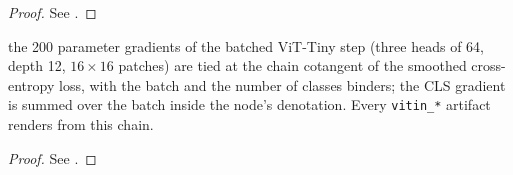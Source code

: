 \begin{proof}
\leanok
See .
\end{proof}

\begin{theorem}
  \label{thm:vit_step_tie}
  \leanok
  \Prove{} the 200 parameter gradients of the batched ViT-Tiny step (three
  heads of 64, depth 12, \(16 \times 16\) patches) are tied at the chain
  cotangent of the smoothed cross-entropy loss, with the batch and the number
  of classes binders; the CLS gradient is summed over the batch inside the
  node's denotation. Every \texttt{vitin\_*} artifact renders from this chain.
\end{theorem}

\begin{proof}
\leanok
See .
\end{proof}

%   
%   
%   
%   

%   
%   
%   
%   


